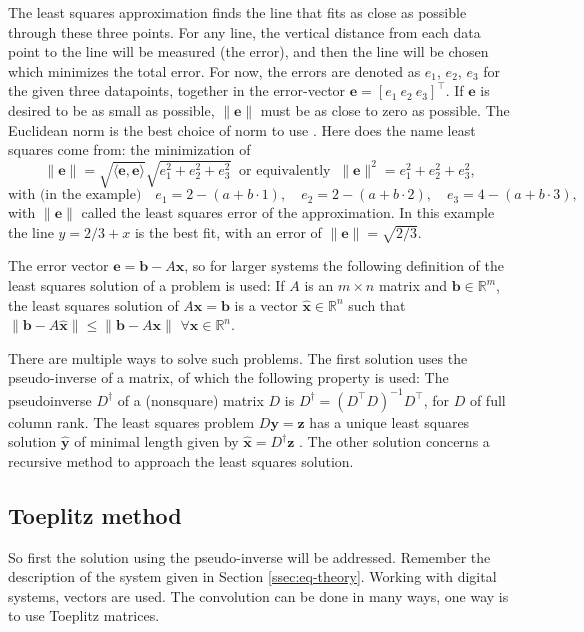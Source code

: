 The least squares approximation finds the line that fits as close as possible through these three points.
For any line, the vertical distance from each data point to the line will be measured (the error), and then the line will be chosen which minimizes the total error.
For now, the errors are denoted as $e_1$, $e_2$, $e_3$ for the given three datapoints, together in the error-vector $\mathbf{e}=[e_1~ e_2~ e_3]^\intercal$.
If $\mathbf{e}$ is desired to be as small as possible, $\|\mathbf{e}\|$ must be as close to zero as possible.
The Euclidean norm is the best choice of norm to use \cite[p.~581]{book:poole}.
Here does the name least squares come from: the minimization of
\begin{equation*}
\|\mathbf{e}\|=\sqrt{\langle\mathbf{e},\mathbf{e}\rangle}\sqrt{e_1^2+e_2^2+e_3^2}~\text{ or equivalently }~\|\mathbf{e}\|^2=e_1^2+e_2^2+e_3^2,
\end{equation*}
\begin{equation*}
\text{with (in the example)}\quad e_1=2-(a+b\cdot 1),\quad e_2=2-(a+b\cdot 2),\quad e_3=4-(a+b\cdot 3),
\end{equation*}
with $\|\mathbf{e}\|$ called the least squares error of the approximation.
In this example the line $y=2/3+x$ is the best fit, with an error of $\|\mathbf{e}\|=\sqrt{2/3}$.

The error vector $\mathbf{e}=\mathbf{b}-A\mathbf{x}$, so for larger systems the following definition \cite[p.~583]{book:poole} of the least squares solution of a problem is used:
If $A$ is an $m\times n$ matrix and $\mathbf{b}\in\mathbb{R}^m$, the least squares solution of $A\mathbf{x}=\mathbf{b}$ is a vector $\hat{\mathbf{x}}\in\mathbb{R}^n$ such that $\|\mathbf{b}-A\hat{\mathbf{x}}\|\leq\|\mathbf{b}-A\mathbf{x}\|$ $\forall \mathbf{x}\in\mathbb{R}^n$.

There are multiple ways to solve such problems.
The first solution uses the pseudo-inverse of a matrix, of which the following property is used:
The pseudoinverse $D^\dagger$ of a (nonsquare) matrix $D$ is $D^\dagger=(D^\intercal D)^{-1}D^\intercal$, for $D$ of full column rank.
The least squares problem $D\mathbf{y}=\mathbf{z}$ has a unique least squares solution $\hat{\mathbf{y}}$ of minimal length given by $\hat{\mathbf{x}}=D^\dagger\mathbf{z}$ \cite[p.~594]{book:poole}.
The other solution concerns a recursive method to approach the least squares solution.

\subsection{Toeplitz method}
\label{ssec:toeplitz}
So first the solution using the pseudo-inverse will be addressed. Remember the description of the system given in Section \ref{ssec:eq-theory}.
Working with digital systems, vectors are used.
The convolution can be done in many ways, one way is to use Toeplitz matrices.

